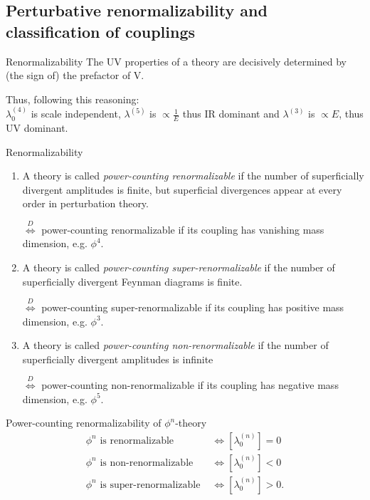 \subsection{Perturbative renormalizability and classification of couplings}
\begin{mybox}{Renormalizability}
	The UV properties of a theory are decisively determined by (the sign of) the prefactor of V.
\end{mybox}
Thus, following this reasoning:\\
$\lambda^{(4)}_0$ is scale independent, $\lambda^{(5)}$ is $\propto \frac{1}{E}$ thus IR dominant and $\lambda^{(3)}$ is $\propto E$, thus UV dominant.
\begin{mybox}{Renormalizability}
	\begin{enumerate}
		\item
	A theory is called \emph{power-counting renormalizable} if the number of superficially divergent amplitudes is finite, but superficial divergences appear at every order in perturbation theory.
	\begin{statements}
		$\stackrel{D}{\Leftrightarrow}$ power-counting renormalizable if its coupling has vanishing mass dimension, e.g. $\phi^4$.
	\end{statements}
\item A theory is called \emph{power-counting super-renormalizable} if the number of superficially divergent Feynman diagrams is finite.
\begin{statements}
	$\stackrel{D}{\Leftrightarrow}$ power-counting super-renormalizable if its coupling has positive mass dimension, e.g. $\phi^3$.
\end{statements}
\item A theory is called \emph{power-counting non-renormalizable} if the number of superficially divergent amplitudes is infinite
\begin{statements}
	$\stackrel{D}{\Leftrightarrow}$ power-counting non-renormalizable if its coupling has negative mass dimension, e.g. $\phi^5$.
\end{statements}
\end{enumerate}
\end{mybox}
\begin{mybox}{Power-counting renormalizability of $\phi^n$-theory}
	\begin{align}
	\phi^n \text{ is renormalizable } &\Leftrightarrow [\lambda^{(n)}_0] = 0 \\
	\phi^n \text{ is non-renormalizable } &\Leftrightarrow [\lambda^{(n)}_0] <0 \\
	\phi^n \text{ is super-renormalizable } &\Leftrightarrow [\lambda^{(n)}_0] > 0. 
	\end{align}
\end{mybox}
